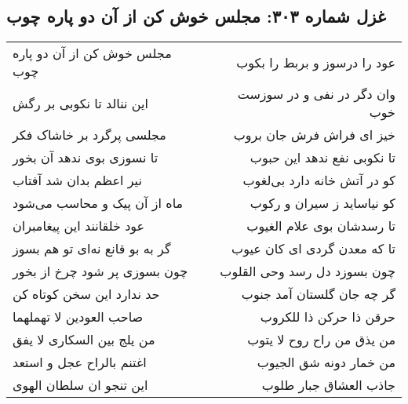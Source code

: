 \begin{center}
\section*{غزل شماره ۳۰۳: مجلس خوش کن از آن دو پاره چوب}
\label{sec:0303}
\begin{longtable}{l p{0.5cm} r}
مجلس خوش کن از آن دو پاره چوب
&&
عود را درسوز و بربط را بکوب
\\
این ننالد تا نکوبی بر رگش
&&
وان دگر در نفی و در سوزست خوب
\\
مجلسی پرگرد بر خاشاک فکر
&&
خیز ای فراش فرش جان بروب
\\
تا نسوزی بوی ندهد آن بخور
&&
تا نکوبی نفع ندهد این حبوب
\\
نیر اعظم بدان شد آفتاب
&&
کو در آتش خانه دارد بی‌لغوب
\\
ماه از آن پیک و محاسب می‌شود
&&
کو نیاساید ز سیران و رکوب
\\
عود خلقانند این پیغامبران
&&
تا رسدشان بوی علام الغیوب
\\
گر به بو قانع نه‌ای تو هم بسوز
&&
تا که معدن گردی ای کان عیوب
\\
چون بسوزی پر شود چرخ از بخور
&&
چون بسوزد دل رسد وحی القلوب
\\
حد ندارد این سخن کوتاه کن
&&
گر چه جان گلستان آمد جنوب
\\
صاحب العودین لا تهملهما
&&
حرقن ذا حرکن ذا للکروب
\\
من یلج بین السکاری لا یفق
&&
من یذق من راح روح لا یتوب
\\
اغتنم بالراح عجل و استعد
&&
من خمار دونه شق الجیوب
\\
این تنجو ان سلطان الهوی
&&
جاذب العشاق جبار طلوب
\\
\end{longtable}
\end{center}
